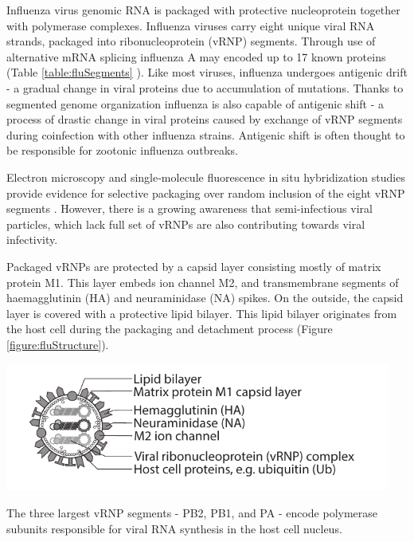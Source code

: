 Influenza virus genomic RNA is packaged with protective nucleoprotein together with polymerase complexes. Influenza viruses carry eight unique viral RNA strands, packaged into ribonucleoprotein  (vRNP) segments. Through use of alternative mRNA splicing influenza A may encoded up to 17 known proteins (Table \ref{table:fluSegments} \cite{das2010structures, dubois2014influenza}). Like most viruses, influenza undergoes antigenic drift - a gradual change in viral proteins due to accumulation of mutations. Thanks to segmented genome organization influenza is also capable of antigenic shift - a process of drastic change in viral proteins caused by exchange of vRNP segments during coinfection with other influenza strains. Antigenic shift is often thought to be responsible for zootonic influenza outbreaks.

Electron microscopy and single‑molecule fluorescence in situ hybridization studies provide evidence for selective packaging over random inclusion of the eight vRNP segments \cite{eisfeld2015centre}. However, there is a growing awareness that semi-infectious viral particles, which lack full set of vRNPs are also contributing towards viral infectivity.

Packaged vRNPs are protected by a capsid layer consisting mostly of matrix protein M1. This layer embeds ion channel M2, and transmembrane segments of haemagglutinin (HA) and neuraminidase (NA) spikes. On the outside, the capsid layer is covered with a protective lipid bilayer. This lipid bilayer originates from the host cell during the packaging and detachment process (Figure \ref{figure:fluStructure}).

\begin{center}
\includegraphics[width=0.95\textwidth, trim={0cm 0cm 0cm 0cm}, clip]{D_chapters/0_introduction/flu_structure.pdf}
\label{figure:fluStructure}
\end{center}

The three largest vRNP segments - PB2, PB1, and PA - encode polymerase subunits responsible for viral RNA synthesis in the host cell nucleus.

